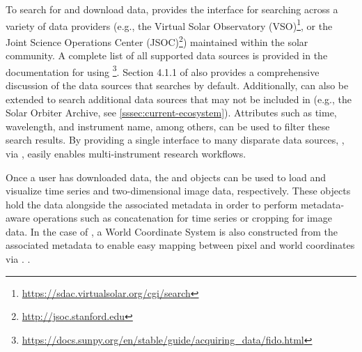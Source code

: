 To search for and download data, \sunpypkg provides the \Fido interface for searching across a variety of data providers (e.g., the Virtual Solar Observatory (VSO)\footnote{\url{https://sdac.virtualsolar.org/cgi/search}}, or the Joint Science Operations Center (JSOC)\footnote{\url{http://jsoc.stanford.edu}}) maintained within the solar community.
A complete list of all supported data sources is provided in the documentation for using \Fido\footnote{\url{https://docs.sunpy.org/en/stable/guide/acquiring_data/fido.html}}.
Section 4.1.1 of \citet{sunpy_community2020} also provides a comprehensive discussion of the data sources that \Fido searches by default.
Additionally, \Fido can also be extended to search additional data sources that may not be included in \sunpypkg (e.g., the Solar Orbiter Archive, see \autoref{sssec:current-ecosystem}).
Attributes such as time, wavelength, and instrument name, among others, can be used to filter these search results.
By providing a single interface to many disparate data sources, \sunpypkg, via \Fido, easily enables multi-instrument research workflows.

Once a user has downloaded data, the  and  objects can be used to load and visualize time series and two-dimensional image data, respectively.
These objects hold the data alongside the associated metadata in order to perform metadata-aware operations such as concatenation for time series or cropping for image data.
In the case of , a World Coordinate System \citep[WCS, e.g.,][]{greisen_representations_2002} is also constructed from the associated metadata to enable easy mapping between pixel and world coordinates via \astropypkg.
\citep{wells_fits_1981}  \citep{pence_definition_2010}.

